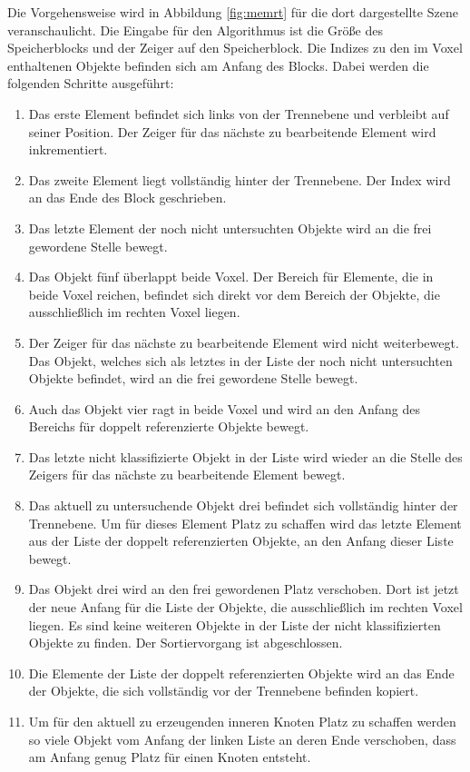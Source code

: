 Die Vorgehensweise wird in Abbildung \ref{fig:memrt} für die dort dargestellte Szene veranschaulicht. Die Eingabe für den Algorithmus ist die Größe des Speicherblocks und der Zeiger auf den Speicherblock. Die Indizes zu den im Voxel enthaltenen Objekte befinden sich am Anfang des Blocks.
Dabei werden die folgenden Schritte ausgeführt:
\begin{enumerate}
 \item Das erste Element befindet sich links von der Trennebene und verbleibt auf seiner Position. Der Zeiger für das nächste zu bearbeitende Element wird inkrementiert.
 \item Das zweite Element liegt vollständig hinter der Trennebene. Der Index wird an das Ende des Block geschrieben.
 \item Das letzte Element der noch nicht untersuchten Objekte wird an die frei gewordene Stelle bewegt.
 \item Das Objekt fünf überlappt beide Voxel. Der Bereich für Elemente, die in beide Voxel reichen, befindet sich direkt vor dem Bereich der Objekte, die ausschließlich im rechten Voxel liegen.
 \item Der Zeiger für das nächste zu bearbeitende Element wird nicht weiterbewegt. Das Objekt, welches sich als letztes in der Liste der noch nicht untersuchten Objekte befindet, wird an die frei gewordene Stelle bewegt.
 \item Auch das Objekt vier ragt in beide Voxel und wird an den Anfang des Bereichs für doppelt referenzierte Objekte bewegt.
 \item Das letzte nicht klassifizierte Objekt in der Liste wird wieder an die Stelle des Zeigers für das nächste zu bearbeitende Element bewegt.
 \item Das aktuell zu untersuchende Objekt drei befindet sich vollständig hinter der Trennebene. Um für dieses Element Platz zu schaffen wird das letzte Element aus der Liste der doppelt referenzierten Objekte, an den Anfang dieser Liste bewegt.
 \item Das Objekt drei wird an den frei gewordenen Platz verschoben. Dort ist jetzt der neue Anfang für die Liste der Objekte, die ausschließlich im rechten Voxel liegen. Es sind keine weiteren Objekte in der Liste der nicht klassifizierten Objekte zu finden. Der Sortiervorgang ist abgeschlossen.
 \item Die Elemente der Liste der doppelt referenzierten Objekte wird an das Ende der Objekte, die sich vollständig vor der Trennebene befinden kopiert.
 \item Um für den aktuell zu erzeugenden inneren Knoten Platz zu schaffen werden so viele Objekt vom Anfang der linken Liste an deren Ende verschoben, dass am Anfang genug Platz für einen Knoten entsteht.

\end{enumerate}

